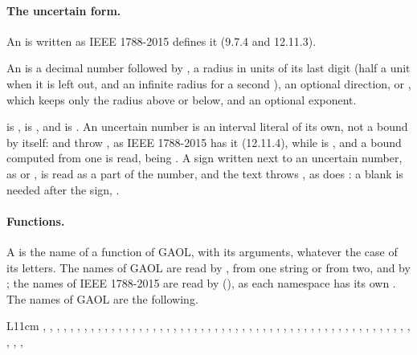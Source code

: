 \paragraph{The uncertain form.} An  is written as
IEEE 1788-2015 defines it (9.7.4 and 12.11.3).
%

\begin{Def}
An  is a decimal number followed by , a radius
in units of its last digit (half a unit when it is left out, and an infinite
radius for a second ), an optional direction,  or ,
which keeps only the radius above or below, and an optional exponent.
\end{Def}

\noindent
{} is ,  is , and
 is .\newinvfive{} An uncertain number is an
interval literal of its own, not a bound by itself:  and
 throw , as IEEE 1788-2015
has it (12.11.4), while  is , and a bound
computed from one is read,  being . A sign written
next to an uncertain number, as  or , is
read as a part of the number, and the text throws
, as does : a blank is needed
after the sign, \mbox{}.\newinvfive

\paragraph{Functions.} A  is the name of a function of GAOL, with
its arguments, whatever the case of its letters. The names of GAOL are read
by , from one string or from two, and by
; the names of IEEE 1788-2015 are read by
 (), as
each namespace has its own .\newinvfive{} The names of GAOL are
the following.

\begin{center}\small
\begin{tabular}{L{11cm}}
, , , , ,
, , , , ,
, , , , ,
, , , , ,
, , , , ,
, , , , ,
, , , , ,
, , , ,
, , , , ,
, , ,
, , , , , ,
, , , ,
\\
\end{tabular}
\end{center}


